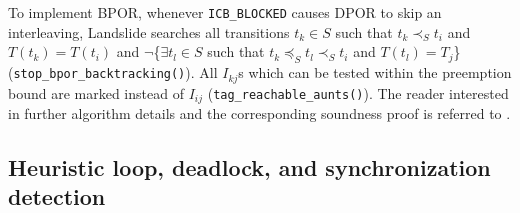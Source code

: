 To implement BPOR,
whenever {\tt ICB\_BLOCKED} causes DPOR to skip an interleaving,
Landslide searches all transitions $t_k \in S$
such that $t_k \prec_S t_i$ and $T(t_k) = T(t_i)$ and
$\neg$\{$\exists t_l \in S$ such that $t_k \preceq_S t_l \prec_S t_i$ and $T(t_l) = T_j$\}
({\tt stop\_bpor\_backtracking()}).
All $I_{kj}$s which can be tested within the preemption bound are marked instead of $I_{ij}$
({\tt tag\_reachable\_aunts()}).
The reader interested in further algorithm details and the corresponding soundness proof is referred to \cite{bpor}.


\subsection{Heuristic loop, deadlock, and synchronization detection}
\label{sec:landslide-blocking}

